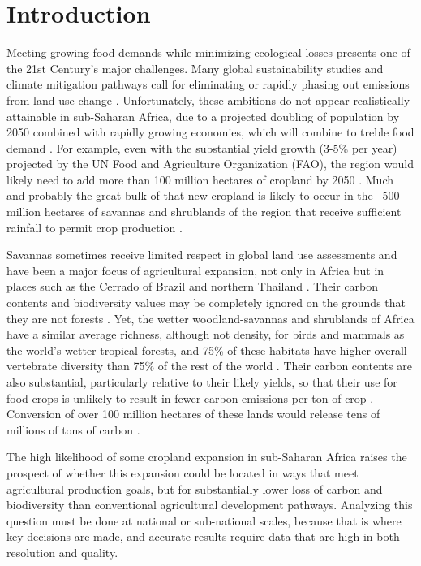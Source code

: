 \documentclass[a4paper]{article}
\begin{document}
\section*{\large Introduction}
Meeting growing food demands while minimizing ecological losses presents one of the 21st Century's major challenges.  Many global sustainability studies and climate mitigation pathways call for eliminating or rapidly phasing out emissions from land use change \cite{searchinger_high_2015,field_summary_2014}.  Unfortunately, these ambitions do not appear realistically attainable in sub-Saharan Africa, due to a projected doubling of population by 2050 combined with rapidly growing  economies, which will combine to treble food demand \citep{tilman_global_2011,searchinger_high_2015}. For example, even with the substantial yield growth (3-5\% per year) projected by the UN Food and Agriculture Organization (FAO), the region would likely need to add more than 100 million hectares of cropland by 2050 \citep{searchinger_high_2015}. Much and probably the great bulk of that new cropland is likely to occur in the ~500 million hectares of savannas and shrublands of the region that receive sufficient rainfall to permit crop production \citep{searchinger_high_2015}. 

Savannas sometimes receive limited respect in global land use assessments and have been a major focus of agricultural expansion, not only in Africa but in places such as the Cerrado of Brazil and northern Thailand \citep{morris_awakening_2009}.  Their carbon contents and biodiversity values may be completely ignored on the grounds that they are not forests \citep{searchinger_high_2015}. Yet, the wetter woodland-savannas and shrublands of Africa have a similar average richness, although not density, for birds and mammals as the world's wetter tropical forests, and 75\% of these habitats have higher overall vertebrate diversity than 75\% of the rest of the world \citep{searchinger_high_2015}.  Their carbon contents are also substantial, particularly relative to their likely yields, so that their use for food crops is unlikely to result in fewer carbon emissions per ton of crop \citep{searchinger_high_2015}.  Conversion of over 100 million hectares of these lands would release tens of millions of tons of carbon \citep{searchinger_high_2015}.  

The high likelihood of some cropland expansion in sub-Saharan Africa raises the prospect of whether this expansion could be located in ways that meet agricultural production goals, but for substantially lower loss of carbon and biodiversity than conventional agricultural development pathways.  Analyzing this question must be done at national or sub-national scales, because that is where key decisions are made, and accurate results require data that are high in both resolution and quality.
\end{document}

